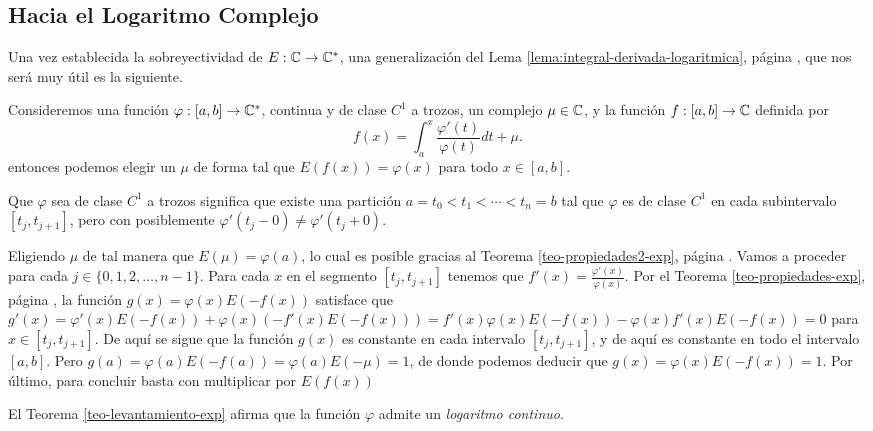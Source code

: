 \subsection{Hacia el Logaritmo Complejo}
Una vez establecida la sobreyectividad de \(E:\mathbb{C} \rightarrow \mathbb{C}^* \), una generalización del Lema \ref{lema:integral-derivada-logaritmica}, página 
\pageref{lema:integral-derivada-logaritmica}, que nos será muy útil es la siguiente.

\begin{theo}[Levantamiento]\label{teo-levantamiento-exp}
    Consideremos una función \(\varphi : [a, b]\rightarrow \mathbb{C}^* \), continua y de clase \(C^1\) a trozos, un complejo \(\mu \in \mathbb{C} \), y la función
    \(f: [a, b] \rightarrow \mathbb{C} \) definida por 
    \[
    \displaystyle f(x) = \int_{a}^{x} \frac{\varphi'(t)}{\varphi(t)} dt + \mu.
    \]
    entonces podemos elegir un \(\mu \) de forma tal que \(E(f(x)) = \varphi(x)\) para todo \(x\in [a,b]\).
\end{theo}
\begin{dem}
    Que \(\varphi\) sea de clase \(C^1\) a trozos significa que existe una partición \(a=t_0 < t_1 < \cdots < t_n = b\) tal que
    \(\varphi\) es de clase \(C^1\) en cada subintervalo \([t_j, t_{j+1}]\), pero con posiblemente \(\varphi'(t_j - 0) \neq \varphi'(t_j + 0)\).

    Eligiendo \(\mu\) de tal manera que \(E(\mu) = \varphi(a)\), lo cual es posible gracias al Teorema \ref{teo-propiedades2-exp}, página \pageref{teo-propiedades2-exp}. 
    Vamos a proceder para cada \(j \in \{0,1,2, \dots , n-1 \}\). Para cada \(x\) en el segmento \([t_j, t_{j+1}]\) tenemos que \(f'(x)= \frac{\varphi'(x)}{\varphi(x)}\).
    Por el Teorema \ref{teo-propiedades-exp}, página \pageref{teo-propiedades-exp}, la función \(g(x) = \varphi(x)E(-f(x))\) satisface que 
    \(g'(x)= \varphi'(x)E(-f(x)) + \varphi(x)(-f'(x)E(-f(x))) = f'(x)\varphi(x)E(-f(x)) - \varphi(x)f'(x)E(-f(x)) = 0 \) para \(x \in [t_j, t_{j+1}]\). De aquí se sigue 
    que la función \(g(x)\) es constante en cada intervalo \([t_j, t_{j+1}]\), y de aquí es constante en todo el intervalo \([a, b]\). Pero 
    \(g(a) = \varphi(a)E(-f(a)) = \varphi(a)E(-\mu) = 1\), de donde podemos deducir que \(g(x) = \varphi(x)E(-f(x)) = 1\). Por último, para concluir basta con multiplicar 
    por \(E(f(x))\)
\end{dem}

\begin{obs}
    El Teorema \ref{teo-levantamiento-exp} afirma que la función \(\varphi\) admite un {\it logaritmo continuo}.
\end{obs}